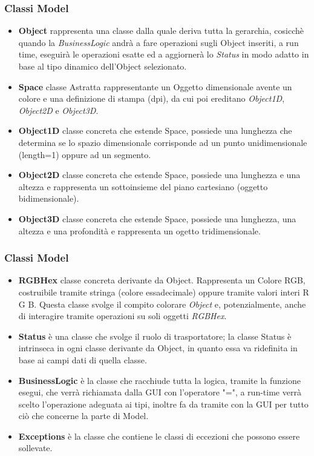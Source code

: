 \documentclass[10pt]{beamer}
\begin{document}
\begin{frame}
\frametitle{Classi Model}
\begin{itemize}
\item \textbf{Object} rappresenta una classe dalla quale deriva tutta la gerarchia, cosicchè quando la \textit{BusinessLogic} andrà a fare operazioni sugli Object inseriti, a run time, eseguirà le operazioni esatte ed a aggiornerà lo \textit{Status} in modo adatto in base al tipo dinamico dell'Object selezionato.
\item \textbf{Space} classe Astratta rappresentante un Oggetto dimensionale avente un colore e una definizione di stampa (dpi), da cui poi ereditano \textit{Object1D}, \textit{Object2D} e \textit{Object3D}.
\item \textbf{Object1D} classe concreta che estende Space, possiede una lunghezza che determina se lo spazio dimensionale corrisponde ad un punto unidimensionale (length=1) oppure ad un segmento.
\item \textbf{Object2D} classe concreta che estende Space, possiede una lunghezza e una altezza e rappresenta un sottoinsieme del piano cartesiano (oggetto bidimensionale).
\item \textbf{Object3D} classe concreta che estende Space, possiede una lunghezza, una altezza e una profondità e rappresenta un ogetto tridimensionale. 



\end{itemize}

\end{frame}


\begin{frame}
\frametitle{Classi Model}
\begin{itemize}
\item \textbf{RGBHex} classe concreta derivante da Object. Rappresenta un Colore RGB, costruibile tramite stringa (colore essadecimale) oppure tramite valori interi R G B.
Questa classe svolge il compito colorare \textit{Object} e, potenzialmente, anche di interagire tramite operazioni su soli oggetti \textit{RGBHex}.

\item \textbf{Status} è una classe che svolge il ruolo di trasportatore; la classe Status è intrinseca in ogni classe derivante da Object, in quanto essa va ridefinita in base ai campi dati di quella classe. 

\item \textbf{BusinessLogic} è la classe che racchiude tutta la logica, tramite la funzione esegui, che verrà richiamata dalla GUI con l'operatore "=", a run-time verrà scelto l'operazione adeguata ai tipi, inoltre fa da tramite con la GUI per tutto ciò che concerne la parte di Model.
\item \textbf{Exceptions} è la classe che contiene le classi di eccezioni che possono essere sollevate.
\end{itemize}
\end{frame}
\end{document}
